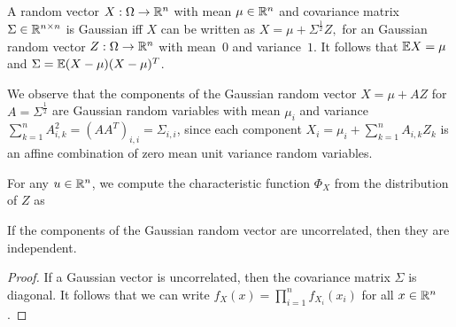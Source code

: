 \documentclass[letterpaper,10pt,english]{article}
\begin{document}
\begin{rem}
A random vector $X:\Omega\to\mathbb{R}^n$ with mean $\mu \in \mathbb{R}^n$ and covariance matrix $\Sigma \in \mathbb{R}^{n\times n}$ is Gaussian iff $X$ can be written as 
$
X = \mu + \Sigma^{\frac{1}{2}}Z,
$
for an  \iid Gaussian random vector $Z: \Omega \to \mathbb{R}^n$ with mean~$0$ and variance~$1$. 
It follows that $\mathbb{E} X = \mu$ and $\Sigma = \mathbb{E}(X-\mu)(X-\mu)^T$. 
\end{rem}
\begin{rem}
We observe that the components of the Gaussian random vector $X = \mu + A Z$ for $A = \Sigma^{\frac{1}{2}}$ are Gaussian random variables with mean $\mu_i$ and variance $\sum_{k=1}^nA_{i,k}^2 = (AA^T)_{i,i} = \Sigma_{i,i}$, 
since each component $X_i = \mu_i + \sum_{k=1}^nA_{i,k}Z_k$ is an affine combination of zero mean unit variance \iid random variables. 
\end{rem}
\begin{rem}
For any $u \in \mathbb{R}^n$, 
we compute the characteristic function $\Phi_X$ from the distribution of $Z$ as 
\end{rem}
\begin{lem} 
If the components of the Gaussian random vector are uncorrelated, 
then they are independent. 
\end{lem} 
\begin{proof}
If a Gaussian vector is uncorrelated, then the covariance matrix $\Sigma$ is diagonal. 
It follows that we can write $f_X(x) = \prod_{i=1}^nf_{X_i}(x_i)$ for all $x\in\mathbb{R}^n$.  
\end{proof}
\end{document}
